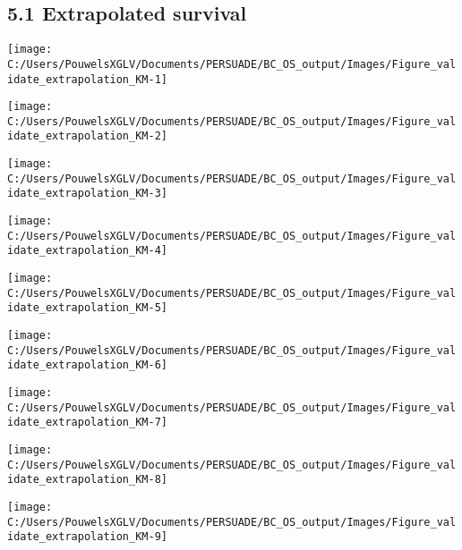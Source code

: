 \documentclass[
]{article}
\begin{document}
\subsection{5.1 Extrapolated survival}\label{extrapolated-survival}

\begin{flushleft}\texttt{[image: C:/Users/PouwelsXGLV/Documents/PERSUADE/BC\_OS\_output/Images/Figure\_validate\_extrapolation\_KM-1]} \end{flushleft}

\begin{flushleft}\texttt{[image: C:/Users/PouwelsXGLV/Documents/PERSUADE/BC\_OS\_output/Images/Figure\_validate\_extrapolation\_KM-2]} \end{flushleft}

\begin{flushleft}\texttt{[image: C:/Users/PouwelsXGLV/Documents/PERSUADE/BC\_OS\_output/Images/Figure\_validate\_extrapolation\_KM-3]} \end{flushleft}

\begin{flushleft}\texttt{[image: C:/Users/PouwelsXGLV/Documents/PERSUADE/BC\_OS\_output/Images/Figure\_validate\_extrapolation\_KM-4]} \end{flushleft}

\begin{flushleft}\texttt{[image: C:/Users/PouwelsXGLV/Documents/PERSUADE/BC\_OS\_output/Images/Figure\_validate\_extrapolation\_KM-5]} \end{flushleft}

\begin{flushleft}\texttt{[image: C:/Users/PouwelsXGLV/Documents/PERSUADE/BC\_OS\_output/Images/Figure\_validate\_extrapolation\_KM-6]} \end{flushleft}

\begin{flushleft}\texttt{[image: C:/Users/PouwelsXGLV/Documents/PERSUADE/BC\_OS\_output/Images/Figure\_validate\_extrapolation\_KM-7]} \end{flushleft}

\begin{flushleft}\texttt{[image: C:/Users/PouwelsXGLV/Documents/PERSUADE/BC\_OS\_output/Images/Figure\_validate\_extrapolation\_KM-8]} \end{flushleft}

\begin{flushleft}\texttt{[image: C:/Users/PouwelsXGLV/Documents/PERSUADE/BC\_OS\_output/Images/Figure\_validate\_extrapolation\_KM-9]} \end{flushleft}
\end{document}
